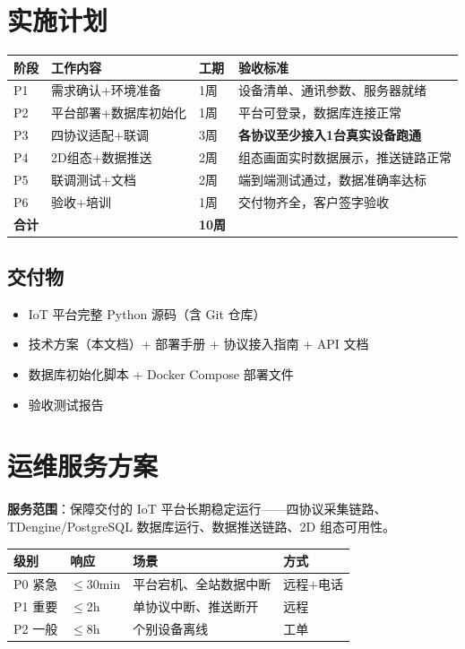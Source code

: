 \documentclass[12pt,a4paper]{ctexart}
\begin{document}
\section{实施计划}

\begin{table}[H]\centering
\begin{tabular}{p{1.2cm}p{3cm}p{1.5cm}p{5cm}}
\toprule\textbf{阶段} & \textbf{工作内容} & \textbf{工期} & \textbf{验收标准} \\
\midrule
P1 & 需求确认+环境准备 & 1周 & 设备清单、通讯参数、服务器就绪 \\
P2 & 平台部署+数据库初始化 & 1周 & 平台可登录，数据库连接正常 \\
P3 & 四协议适配+联调 & 3周 & \textbf{各协议至少接入1台真实设备跑通} \\
P4 & 2D组态+数据推送 & 2周 & 组态画面实时数据展示，推送链路正常 \\
P5 & 联调测试+文档 & 2周 & 端到端测试通过，数据准确率达标 \\
P6 & 验收+培训 & 1周 & 交付物齐全，客户签字验收 \\
\hline
\textbf{合计} & & \textbf{10周} & \\
\bottomrule
\end{tabular}
\end{table}

\subsection{交付物}
\begin{itemize}
  \item IoT 平台完整 Python 源码（含 Git 仓库）
  \item 技术方案（本文档）+ 部署手册 + 协议接入指南 + API 文档
  \item 数据库初始化脚本 + Docker Compose 部署文件
  \item 验收测试报告
\end{itemize}

\section{运维服务方案}

\textbf{服务范围}：保障交付的 IoT 平台长期稳定运行——四协议采集链路、TDengine/PostgreSQL 数据库运行、数据推送链路、2D 组态可用性。

\begin{table}[H]\centering
\begin{tabular}{p{2cm}p{2cm}p{4cm}p{4cm}}
\toprule\textbf{级别} & \textbf{响应} & \textbf{场景} & \textbf{方式} \\
\midrule
P0 紧急 & $\leq$30min & 平台宕机、全站数据中断 & 远程+电话 \\
P1 重要 & $\leq$2h & 单协议中断、推送断开 & 远程 \\
P2 一般 & $\leq$8h & 个别设备离线 & 工单 \\
\bottomrule
\end{tabular}
\end{table}
\end{document}
